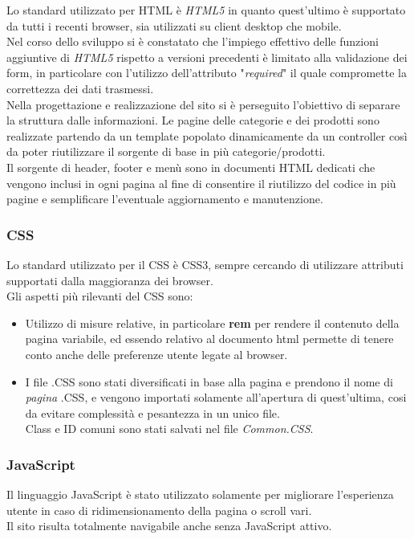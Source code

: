Lo standard utilizzato per HTML è \textit{HTML5} in quanto quest'ultimo è supportato da tutti i recenti browser, sia utilizzati su client desktop che mobile.\\
Nel corso dello sviluppo si è constatato che l'impiego effettivo delle funzioni aggiuntive di \textit{HTML5} rispetto a versioni precedenti è limitato alla validazione dei form, in particolare con l'utilizzo dell'attributo "\textit{required}" il quale compromette la correttezza dei dati trasmessi.\\
Nella progettazione e realizzazione del sito si è perseguito l’obiettivo di separare la struttura dalle informazioni.
Le pagine delle categorie e dei prodotti sono realizzate partendo da un template popolato dinamicamente da un controller così da poter riutilizzare il sorgente di base in più categorie/prodotti.\\
Il sorgente di header, footer e menù sono in documenti HTML dedicati che vengono inclusi in ogni pagina al fine di consentire il riutilizzo del codice in più pagine e semplificare l’eventuale aggiornamento e manutenzione. 


\subsubsection{CSS}
Lo standard utilizzato per il CSS è CSS3, sempre cercando di utilizzare attributi supportati dalla maggioranza dei browser.\\
Gli aspetti più rilevanti del CSS sono:
\begin{itemize}
	\item Utilizzo di misure relative, in particolare \textbf{rem} per rendere il contenuto della pagina variabile, ed essendo relativo al documento html permette di tenere conto anche delle preferenze utente legate al browser.
	\item I file .CSS sono stati diversificati in base alla pagina e prendono il nome di \textit{pagina} .CSS, e vengono importati solamente all'apertura di quest'ultima, cosi da evitare complessità e pesantezza in un unico file.\\Class e ID comuni sono stati salvati nel file \textit{Common.CSS}.
\end{itemize}

\subsubsection{JavaScript}
Il linguaggio JavaScript è stato utilizzato solamente per migliorare l'esperienza utente in caso di ridimensionamento della pagina o scroll vari.\\ Il sito risulta totalmente navigabile anche senza JavaScript attivo.

